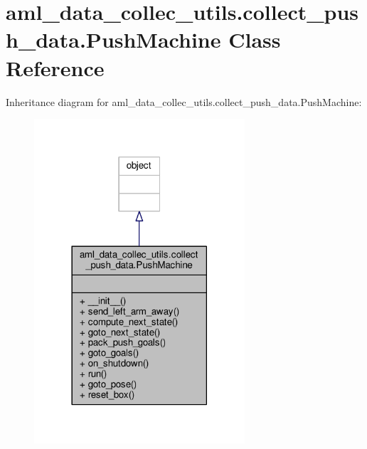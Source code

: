 \hypertarget{classaml__data__collec__utils_1_1collect__push__data_1_1_push_machine}{\section{aml\-\_\-data\-\_\-collec\-\_\-utils.\-collect\-\_\-push\-\_\-data.\-Push\-Machine Class Reference}
\label{classaml__data__collec__utils_1_1collect__push__data_1_1_push_machine}
}


Inheritance diagram for aml\-\_\-data\-\_\-collec\-\_\-utils.\-collect\-\_\-push\-\_\-data.\-Push\-Machine\-:
\nopagebreak
\begin{figure}[H]
\begin{center}
\leavevmode
\includegraphics[width=222pt]{classaml__data__collec__utils_1_1collect__push__data_1_1_push_machine__inherit__graph}
\end{center}
\end{figure}


